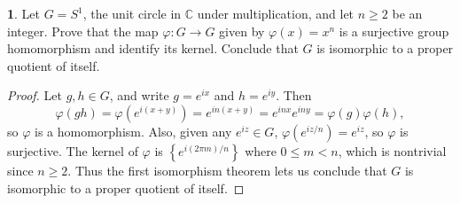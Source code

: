 \documentclass[12pt]{article}
\theoremstyle{definition}
\newtheorem{ex}{}
\begin{document}
\begin{ex}
	Let $G = S^1$, the unit circle in $\mathbb{C}$ under multiplication, and let $n \geq 2$ be an integer.
	Prove that the map $\varphi : G \to G$ given by $\varphi(x) = x^n$ is a surjective group homomorphism and identify its kernel.
	Conclude that $G$ is isomorphic to a proper quotient of itself.
\end{ex}
\begin{proof}
	Let $g, h \in G$, and write $g = e^{ix}$ and $h = e^{iy}$.
	Then \begin{equation*}
		\varphi(gh) = \varphi(e^{i(x + y)}) = e^{in(x + y)} = e^{inx}e^{iny} = \varphi(g)\varphi(h),
	\end{equation*}
	so $\varphi$ is a homomorphism.
	Also, given any $e^{iz} \in G$, $\varphi(e^{i z/n}) = e^{iz}$, so $\varphi$ is surjective.
	The kernel of $\varphi$ is $\left\lbrace e^{i (2\pi m)/n} \right\rbrace$ where $0 \leq m < n$, which is nontrivial since $n \geq 2$.
	Thus the first isomorphism theorem lets us conclude that $G$ is isomorphic to a proper quotient of itself.
\end{proof}
\end{document}
